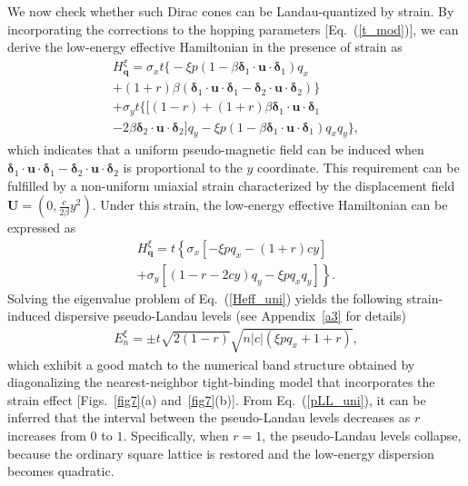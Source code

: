 \documentclass[aps, twocolumn, floatfix, superscriptaddress, prb]{revtex4-1}
\begin{document}
We now check whether such Dirac cones can be Landau-quantized by strain. By incorporating the corrections to the hopping parameters [Eq.~(\ref{t_mod})], we can derive the low-energy effective Hamiltonian in the presence of strain as
%
\begin{equation}
\begin{split}
{
H_{\bm q}^\xi = \sigma_x t \Big\{-\xi p \left(1-\beta \bm{\delta}_1\cdot\bm{u}\cdot\bm{\delta}_1\right)q_x
}
\\
{
+(1+r) \beta \left(\bm{\delta}_1\cdot\bm{u}\cdot\bm{\delta}_1-\bm{\delta}_2\cdot\bm{u}\cdot\bm{\delta}_2\right) \Big\}
}
\\
{
+\sigma_yt \Big\{ [{(1-r)}+(1+r)\beta\bm{\delta}_1\cdot\bm{u}\cdot\bm{\delta}_1
}
\\
{
-2\beta\bm{\delta}_2\cdot\bm{u}\cdot\bm{\delta}_2]q_y -\xi p \left(1- \beta \bm{\delta}_1\cdot\bm{u}\cdot\bm{\delta}_1\right) q_xq_y \Big\},
}
\end{split}
\end{equation}
%
which indicates that a uniform pseudo-magnetic field can be induced when $\bm{\delta}_1 \cdot \bm{u} \cdot \bm{\delta}_1 - \bm{\delta}_2 \cdot \bm{u} \cdot \bm{\delta}_2$ is proportional to the $y$ coordinate. This requirement can be fulfilled by a non-uniform uniaxial strain characterized by the displacement field ${\bm U}=(0,\frac{c}{2\beta}y^2)$. Under this strain, the low-energy effective Hamiltonian can be expressed as
%
\begin{equation}\label{Heff_uni}
\begin{split}
{
H_{\bm q}^\xi = t\left\lbrace\sigma_x\left[-\xi p q_x-(1+r)cy\right]\right.
}
\\
{
\left.+\sigma_y\left[\left(1-r-2cy\right)q_y-\xi p q_xq_y\right]\right\rbrace.
}
\end{split}
\end{equation}
%
Solving the eigenvalue problem of Eq.~(\ref{Heff_uni}) yields the following strain-induced dispersive pseudo-Landau levels (see Appendix~\ref{a3} for details)
%
\begin{align}\label{pLL_uni}
{
E_n^\xi=\pm t\sqrt{2(1-r)}\sqrt{n|c|\left(\xi p q_x+1+r\right)},
}
\end{align}
%
which exhibit a good match to the numerical band structure obtained by diagonalizing the nearest-neighbor tight-binding model that incorporates the strain effect [Figs.~\ref{fig7}(a) and~\ref{fig7}(b)]. From Eq.~(\ref{pLL_uni}), it can be inferred that the interval between the pseudo-Landau levels decreases as $r$ increases from $0$ to $1$. Specifically, when $r=1$, the pseudo-Landau levels collapse, because the ordinary square lattice is restored and the low-energy dispersion becomes quadratic.
\end{document}
